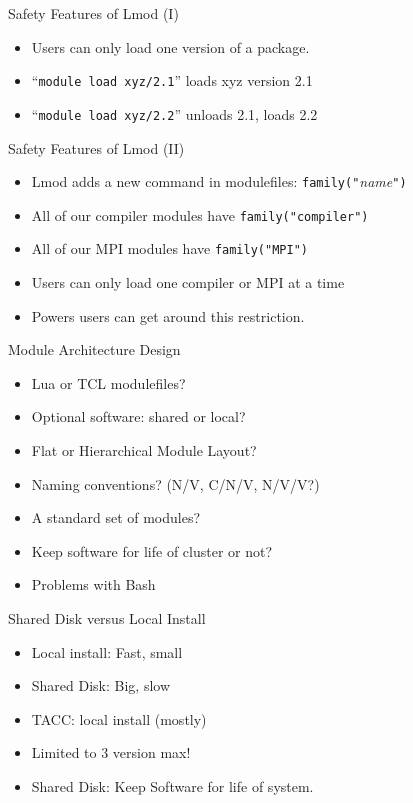 \documentclass[dvipsnames,aspectratio=169]{beamer}
\begin{document}
\begin{frame}{Safety Features of Lmod (I)}
  \begin{itemize}
    \item Users can only load one version of a package.
    \item ``\texttt{module load xyz/2.1}'' loads xyz version 2.1
    \item ``\texttt{module load xyz/2.2}'' unloads 2.1, loads 2.2
  \end{itemize}
\end{frame}

\begin{frame}{Safety Features of Lmod (II)}
  \begin{itemize}
    \item Lmod adds a new command in modulefiles: \texttt{family("}\emph{name}\texttt{")}
    \item All of our compiler modules have \texttt{family("compiler")}
    \item All of our MPI modules have \texttt{family("MPI")}
    \item Users can only load one compiler or MPI at a time
    \item Powers users can get around this restriction.
  \end{itemize}
\end{frame}

\begin{frame}{Module Architecture Design}
  \begin{itemize}
    \item Lua or TCL modulefiles?
    \item Optional software: shared or local?
    \item Flat or Hierarchical Module Layout?
    \item Naming conventions? (N/V, C/N/V, N/V/V?)
    \item A standard set of modules?
    \item Keep software for life of cluster or not?
    \item Problems with Bash
  \end{itemize}
\end{frame}

\begin{frame}{Shared Disk versus Local Install}
  \begin{itemize}
    \item Local install: Fast, small 
    \item Shared Disk: Big, slow
    \item TACC: local install (mostly)
    \item Limited to 3 version max!
    \item Shared Disk: Keep Software for life of system.
  \end{itemize}
\end{frame}
\end{document}
